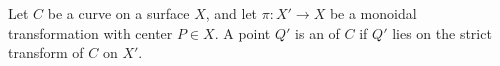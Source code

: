 Let $C$ be a curve on a surface $X$, and let $\pi: X' \to X$ be a monoidal transformation with center $P \in X$. A point $Q'$ is an  of $C$ if $Q'$ lies on the strict transform of $C$ on $X'$.
